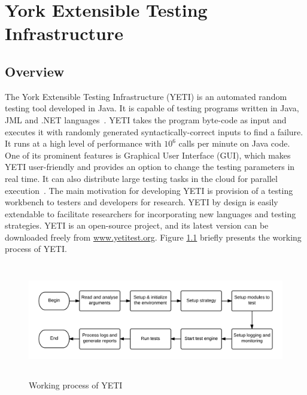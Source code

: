 
\chapter{York Extensible Testing Infrastructure}
\label{chap:yeti_3}





\section{Overview}
The York Extensible Testing Infrastructure (YETI) is an automated random testing tool developed in Java. It is capable of testing programs written in Java, JML and .NET languages~\cite{oriol2010testing}. YETI takes the program byte-code as input and executes it with randomly generated syntactically-correct inputs to find a failure. It runs at a high level of performance with $10^6$ calls per minute on Java code. One of its prominent features is Graphical User Interface (GUI), which makes YETI user-friendly and provides an option to change the testing parameters in real time. It can also distribute large testing tasks in the cloud for parallel execution~\cite{oriol2010yeti}. The main motivation for developing YETI is provision of a testing workbench to testers and developers for research. YETI by design is easily extendable to facilitate researchers for incorporating new languages and testing strategies. YETI is an open-source project, and its latest version can be downloaded freely from \url{www.yetitest.org}. Figure \ref{fig:yetiOverview} briefly presents the working process of YETI. 

\begin{figure}[h]
	\centering
	\includegraphics[width=15.3cm, height=5cm]{chapter3/workingProcess.png}
	\bigskip
	\caption{Working process of YETI}
	\label{fig:yetiOverview}
\end{figure}


